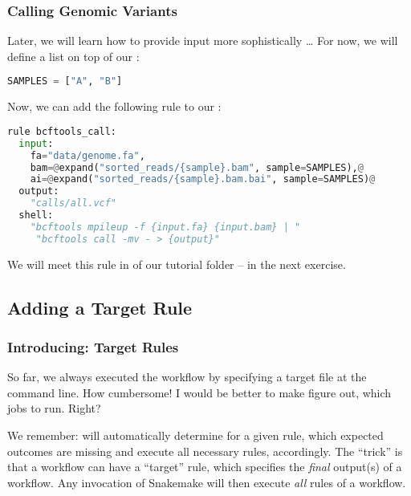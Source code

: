 \begin{frame}[fragile]
  \frametitle{Calling Genomic Variants}
  Later, we will learn how to provide input more sophistically \ldots\newline
  For now, we will define a list on top of our :
  \begin{lstlisting}[language=Python,style=Python]
SAMPLES = ["A", "B"]
  \end{lstlisting}
  Now, we can add the following rule to our :
  \begin{lstlisting}[language=Python,style=Python,basicstyle=\footnotesize]
rule bcftools_call:
  input:
    fa="data/genome.fa",
    bam=@expand("sorted_reads/{sample}.bam", sample=SAMPLES),@
    ai=@expand("sorted_reads/{sample}.bam.bai", sample=SAMPLES)@
  output:
    "calls/all.vcf"
  shell:
    "bcftools mpileup -f {input.fa} {input.bam} | "
     "bcftools call -mv - > {output}"
  \end{lstlisting}
  We will meet this rule in  of our tutorial folder -- in the next exercise.
\end{frame}

\subsection{Adding a Target Rule}

\begin{frame}
	\frametitle{Introducing: Target Rules}
	\begin{question}
	  So far, we always executed the workflow by specifying a target file at the command line. How cumbersome!\newline
	  I would be better to make \Snakemake{} figure out, which jobs to run. Right?
	\end{question}
    \pause
	\begin{docs}
		We remember: \Snakemake{} will automatically determine for a given rule, which expected outcomes are missing and execute all necessary rules, accordingly.\newline\pause
		The ``trick'' is that a workflow can have a ``target'' rule, which specifies the \emph{final} output(s) of a workflow. Any invocation of Snakemake will then execute \emph{all} rules of a workflow.
	\end{docs}
\end{frame}

